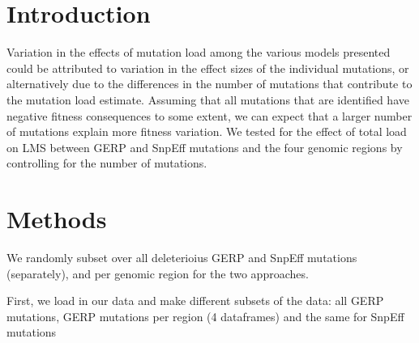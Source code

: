 \documentclass[
  letterpaper,
  DIV=11,
  numbers=noendperiod]{scrreprt}
\begin{document}
\hypertarget{introduction-6}{%
\section{Introduction}\label{introduction-6}}

Variation in the effects of mutation load among the various models
presented could be attributed to variation in the effect sizes of the
individual mutations, or alternatively due to the differences in the
number of mutations that contribute to the mutation load estimate.
Assuming that all mutations that are identified have negative fitness
consequences to some extent, we can expect that a larger number of
mutations explain more fitness variation. We tested for the effect of
total load on LMS between GERP and SnpEff mutations and the four genomic
regions by controlling for the number of mutations.

\hypertarget{methods-3}{%
\section{Methods}\label{methods-3}}

We randomly subset over all deleterioius GERP and SnpEff mutations
(separately), and per genomic region for the two approaches.

First, we load in our data and make different subsets of the data: all
GERP mutations, GERP mutations per region (4 dataframes) and the same
for SnpEff mutations
\end{document}
